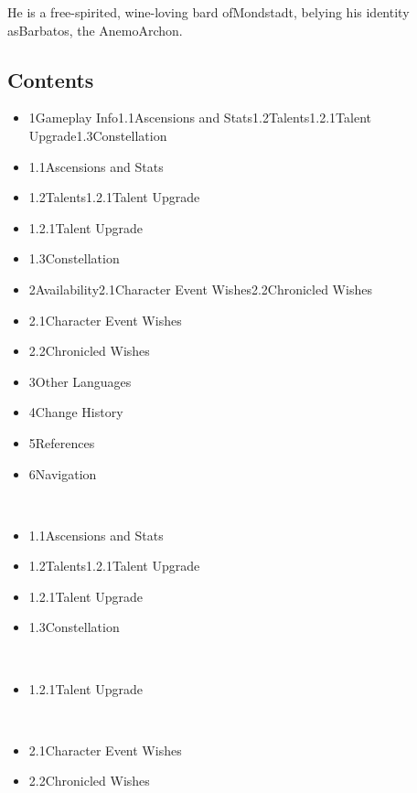 \documentclass[a4paper,12pt]{article}
\begin{document}
He is a free-spirited, wine-loving bard ofMondstadt, belying his identity asBarbatos, the AnemoArchon.\\ \par \vspace{0.5cm}

\subsection*{Contents}\n\n\begin{itemize}
\item 1Gameplay Info1.1Ascensions and Stats1.2Talents1.2.1Talent Upgrade1.3Constellation
\item 1.1Ascensions and Stats
\item 1.2Talents1.2.1Talent Upgrade
\item 1.2.1Talent Upgrade
\item 1.3Constellation
\item 2Availability2.1Character Event Wishes2.2Chronicled Wishes
\item 2.1Character Event Wishes
\item 2.2Chronicled Wishes
\item 3Other Languages
\item 4Change History
\item 5References
\item 6Navigation
\end{itemize}\\ \par \vspace{0.5cm}

\begin{itemize}
\item 1.1Ascensions and Stats
\item 1.2Talents1.2.1Talent Upgrade
\item 1.2.1Talent Upgrade
\item 1.3Constellation
\end{itemize}\\ \par \vspace{0.5cm}

\begin{itemize}
\item 1.2.1Talent Upgrade
\end{itemize}\\ \par \vspace{0.5cm}

\begin{itemize}
\item 2.1Character Event Wishes
\item 2.2Chronicled Wishes
\end{itemize}\\ \par \vspace{0.5cm}
\end{document}
